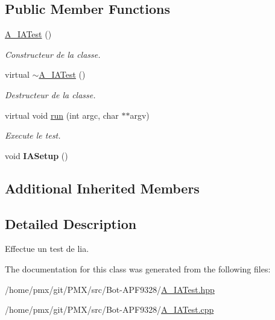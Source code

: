 \subsection*{Public Member Functions}
\begin{DoxyCompactItemize}
\item 
\mbox{\label{classA__IATest_a4e0b06427c9fa4c9c42a6613c6849537}} 
\hyperlink{classA__IATest_a4e0b06427c9fa4c9c42a6613c6849537}{A\+\_\+\+I\+A\+Test} ()
\begin{DoxyCompactList}\small\item\em Constructeur de la classe. \end{DoxyCompactList}\item 
\mbox{\label{classA__IATest_aad21565c20c7922bbd347a10f9d7c18c}} 
virtual \hyperlink{classA__IATest_aad21565c20c7922bbd347a10f9d7c18c}{$\sim$\+A\+\_\+\+I\+A\+Test} ()
\begin{DoxyCompactList}\small\item\em Destructeur de la classe. \end{DoxyCompactList}\item 
\mbox{\label{classA__IATest_a53c1fd77a64d6a55a6386829ba6f7697}} 
virtual void \hyperlink{classA__IATest_a53c1fd77a64d6a55a6386829ba6f7697}{run} (int argc, char $\ast$$\ast$argv)
\begin{DoxyCompactList}\small\item\em Execute le test. \end{DoxyCompactList}\item 
\mbox{\label{classA__IATest_a090b6253ad7daff1b0cbdd581177493a}} 
void {\bfseries I\+A\+Setup} ()
\end{DoxyCompactItemize}
\subsection*{Additional Inherited Members}


\subsection{Detailed Description}
Effectue un test de l\textquotesingle{}ia. 

The documentation for this class was generated from the following files\+:\begin{DoxyCompactItemize}
\item 
/home/pmx/git/\+P\+M\+X/src/\+Bot-\/\+A\+P\+F9328/\hyperlink{A__IATest_8hpp}{A\+\_\+\+I\+A\+Test.\+hpp}\item 
/home/pmx/git/\+P\+M\+X/src/\+Bot-\/\+A\+P\+F9328/\hyperlink{A__IATest_8cpp}{A\+\_\+\+I\+A\+Test.\+cpp}\end{DoxyCompactItemize}
